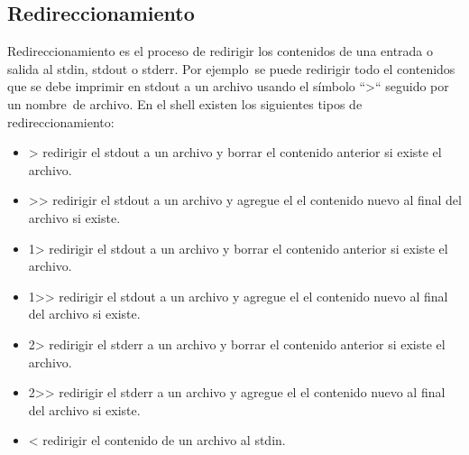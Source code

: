 \newpage
\subsection{Redireccionamiento}
Redireccionamiento es el proceso de redirigir los contenidos de una entrada o salida al stdin, stdout o stderr. Por ejemplo\
se puede redirigir todo el contenidos que se debe imprimir en stdout a un archivo usando el símbolo ``>`` seguido por un nombre\
de archivo. En el shell existen los siguientes tipos de redireccionamiento:
\begin{itemize}
    \item > \newline \Quad redirigir el stdout a un archivo y borrar el contenido anterior si existe el archivo.
    \item >\null> \newline \Quad redirigir el stdout a un archivo y agregue el el contenido nuevo al final del archivo si existe.
    \item 1> \newline \Quad redirigir el stdout a un archivo y borrar el contenido anterior si existe el archivo.
    \item 1>\null> \newline \Quad redirigir el stdout a un archivo y agregue el el contenido nuevo al final del archivo si existe.
    \item 2> \newline \Quad redirigir el stderr a un archivo y borrar el contenido anterior si existe el archivo.
    \item 2>\null> \newline \Quad redirigir el stderr a un archivo y agregue el el contenido nuevo al final del archivo si existe.
    \item < \newline \Quad redirigir el contenido de un archivo al stdin.
\end{itemize}